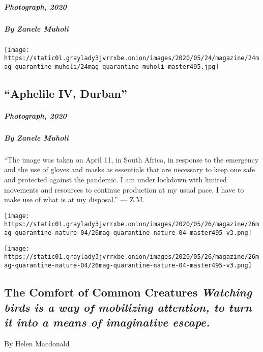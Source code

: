 \hypertarget{photograph-2020-3}{%
\subparagraph{Photograph, 2020}\label{photograph-2020-3}}

\hypertarget{by-zanele-muholi-1}{%
\subparagraph{By Zanele Muholi}\label{by-zanele-muholi-1}}

\texttt{[image: https://static01.graylady3jvrrxbe.onion/images/2020/05/24/magazine/24mag-quarantine-muholi/24mag-quarantine-muholi-master495.jpg]}

\hypertarget{aphelile-iv-durban-2}{%
\subsection{``Aphelile IV, Durban''}\label{aphelile-iv-durban-2}}

\hypertarget{photograph-2020-4}{%
\subparagraph{Photograph, 2020}\label{photograph-2020-4}}

\hypertarget{by-zanele-muholi-2}{%
\subparagraph{By Zanele Muholi}\label{by-zanele-muholi-2}}

``The image was taken on April 11, in South Africa, in response to the
emergency and the use of gloves and masks as essentials that are
necessary to keep one safe and protected against the pandemic. I am
under lockdown with limited movements and resources to continue
production at my usual pace. I have to make use of what is at my
disposal.'' --- Z.M.

\texttt{[image: https://static01.graylady3jvrrxbe.onion/images/2020/05/26/magazine/26mag-quarantine-nature-04/26mag-quarantine-nature-04-master495-v3.png]}

\texttt{[image: https://static01.graylady3jvrrxbe.onion/images/2020/05/26/magazine/26mag-quarantine-nature-04/26mag-quarantine-nature-04-master495-v3.png]}

\hypertarget{the-comfort-of-common-creatures-watching-birds-is-a-way-of-mobilizing-attention-to-turn-it-into-a-means-of-imaginative-escape}{%
\subsection{\texorpdfstring{The Comfort of Common Creatures
\emph{Watching birds is a way of mobilizing attention, to turn it into a
means of imaginative
escape.}}{The Comfort of Common Creatures Watching birds is a way of mobilizing attention, to turn it into a means of imaginative escape.}}\label{the-comfort-of-common-creatures-watching-birds-is-a-way-of-mobilizing-attention-to-turn-it-into-a-means-of-imaginative-escape}}

By Helen Macdonald

